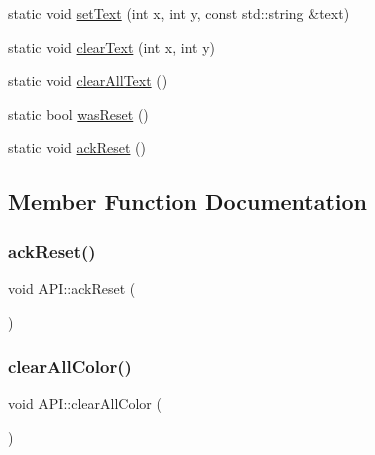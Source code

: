 \begin{DoxyCompactItemize}
static void \hyperlink{class_a_p_i_a25a489520b0b69b7a0b1870cf350f654}{set\+Text} (int x, int y, const std\+::string \&text)
\item 
static void \hyperlink{class_a_p_i_a0937e059fff7d9543187765500fa4968}{clear\+Text} (int x, int y)
\item 
static void \hyperlink{class_a_p_i_a212ef41a4d954a80cd08f462fdb9f631}{clear\+All\+Text} ()
\item 
static bool \hyperlink{class_a_p_i_ab754e11300491d9efee2da2eda368d93}{was\+Reset} ()
\item 
static void \hyperlink{class_a_p_i_a3e6a76df2da89bd7f7fc72a96e0a9094}{ack\+Reset} ()
\end{DoxyCompactItemize}


\subsection{Member Function Documentation}
\mbox{\label{class_a_p_i_a3e6a76df2da89bd7f7fc72a96e0a9094}} 
\subsubsection{\texorpdfstring{ack\+Reset()}{ackReset()}}
{\footnotesize\ttfamily void A\+P\+I\+::ack\+Reset (\begin{DoxyParamCaption}{ }\end{DoxyParamCaption})\hspace{0.3cm}{\ttfamily [static]}}

\mbox{\label{class_a_p_i_a26cc8c35d6c492fc782647b7e347525e}} 
\subsubsection{\texorpdfstring{clear\+All\+Color()}{clearAllColor()}}
{\footnotesize\ttfamily void A\+P\+I\+::clear\+All\+Color (\begin{DoxyParamCaption}{ }\end{DoxyParamCaption})\hspace{0.3cm}{\ttfamily [static]}}

\mbox{\label{class_a_p_i_a212ef41a4d954a80cd08f462fdb9f631}} 
